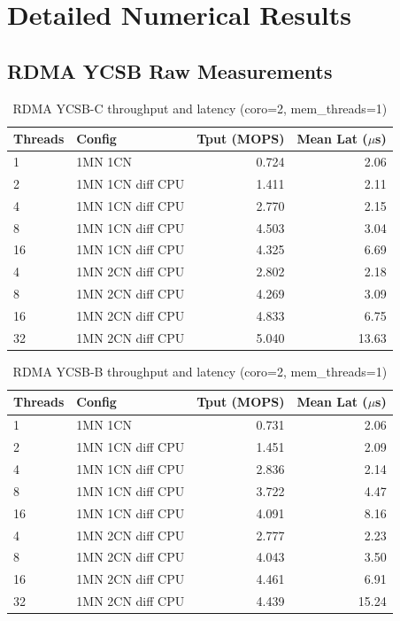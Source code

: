 \documentclass[conference]{IEEEtran}
\begin{document}
\section{Detailed Numerical Results}\label{app:tables}

\subsection*{RDMA YCSB Raw Measurements}

\begin{table}[H]
\caption{RDMA YCSB-C throughput and latency (coro=2, mem\_threads=1)}
\label{tab:rdma-ycsbc}
\scriptsize
\begin{tabular}{@{}llrr@{}}
\toprule
\textbf{Threads} & \textbf{Config} & \textbf{Tput (MOPS)} & \textbf{Mean Lat ($\mu$s)} \\
\midrule
1  & 1MN 1CN             & 0.724 & 2.06 \\
2  & 1MN 1CN diff CPU    & 1.411 & 2.11 \\
4  & 1MN 1CN diff CPU    & 2.770 & 2.15 \\
8  & 1MN 1CN diff CPU    & 4.503 & 3.04 \\
16 & 1MN 1CN diff CPU    & 4.325 & 6.69 \\
\midrule
4  & 1MN 2CN diff CPU    & 2.802 & 2.18 \\
8  & 1MN 2CN diff CPU    & 4.269 & 3.09 \\
16 & 1MN 2CN diff CPU    & 4.833 & 6.75 \\
32 & 1MN 2CN diff CPU    & 5.040 & 13.63 \\
\bottomrule
\end{tabular}
\end{table}

\begin{table}[H]
\centering
\caption{RDMA YCSB-B throughput and latency (coro=2, mem\_threads=1)}
\label{tab:rdma-ycsbb}
\scriptsize
\begin{tabular}{@{}llrr@{}}
\toprule
\textbf{Threads} & \textbf{Config} & \textbf{Tput (MOPS)} & \textbf{Mean Lat ($\mu$s)} \\
\midrule
1  & 1MN 1CN             & 0.731 & 2.06 \\
2  & 1MN 1CN diff CPU    & 1.451 & 2.09 \\
4  & 1MN 1CN diff CPU    & 2.836 & 2.14 \\
8  & 1MN 1CN diff CPU    & 3.722 & 4.47 \\
16 & 1MN 1CN diff CPU    & 4.091 & 8.16 \\
\midrule
4  & 1MN 2CN diff CPU    & 2.777 & 2.23 \\
8  & 1MN 2CN diff CPU    & 4.043 & 3.50 \\
16 & 1MN 2CN diff CPU    & 4.461 & 6.91 \\
32 & 1MN 2CN diff CPU    & 4.439 & 15.24 \\
\bottomrule
\end{tabular}
\end{table}
\end{document}
